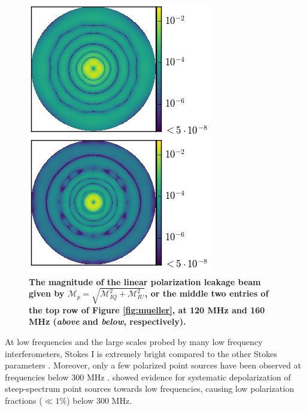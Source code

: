 \documentclass[twocolumn, trackchanges]{aastex61}
\newcommand{\edited}[1]{{\bf \color{red} #1}}
\begin{document}
\begin{figure}
\centering
\hspace{-0.5cm}\includegraphics[scale=0.6]{M_p.png}
\caption{\edited{The magnitude of the linear polarization leakage beam given by $\mathcal{M}_p = \sqrt{\mathcal{M}_{IQ}^2 + \mathcal{M}_{IU}^2}$, or the middle two entries of the top row of Figure \ref{fig:mueller}, at 120 MHz and 160 MHz (\textit{above} and \textit{below}, respectively).
}}
\label{fig:lin_pol_beam}
\end{figure}


At low frequencies and the large scales probed by many low frequency interferometers, Stokes I is extremely bright compared to the other Stokes parameters \citep{Bernardi.09, Bernardi.10, Jelic.14, Jelic.15, Asad15, Kohn16, Lenc.17, Moore17}. Moreover, only a few polarized point sources have been observed at frequencies below 300 MHz \citep{Bernardi.13, Asad.16, Lenc.17}. \cite{Farnes.14} showed evidence for systematic depolarization of steep-spectrum point sources towards low frequencies, causing low polarization fractions ($\ll 1\%$) below 300 MHz. 
\end{document}
